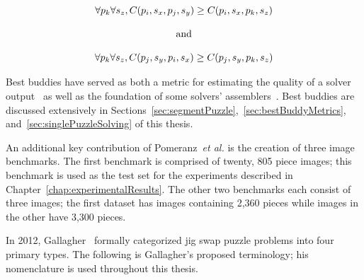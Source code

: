 \begin{equation} \label{eq:pomeranzBestBuddyDefinition}
\centering
\begin{split}
	\begin{matrix}
		\forall{p_{k}}\forall{s_z},C(p_i, s_x, p_j, s_y) \geq C(p_i, s_x, p_k, s_z)
		\\
		\\
		\textnormal{and}
		\\
		\\
		\forall{p_{k}}\forall{s_z},C(p_j, s_y, p_i, s_x) \geq C(p_j, s_y, p_k, s_z)
	\end{matrix}
\end{split}
\end{equation} 

Best buddies have served as both a metric for estimating the quality of a solver output~\cite{sholomon2013} as well as the foundation of some solvers' assemblers~\cite{paikin2015}.  Best buddies are discussed extensively in Sections~\ref{sec:segmentPuzzle},~\ref{sec:bestBuddyMetrics}, and~\ref{sec:singlePuzzleSolving} of this thesis.

An additional key contribution of Pomeranz~\textit{et al.} is the creation of three image benchmarks.  The first benchmark is comprised of twenty, 805 piece images; this benchmark is used as the test set for the experiments described in Chapter~\ref{chap:experimentalResults}. The other two benchmarks each consist of three images; the first dataset has images containing 2,360 pieces while images in the other have 3,300 pieces.

In 2012, Gallagher~\cite{gallagher2012} formally categorized jig swap puzzle problems into four primary types.  The following is Gallagher's proposed terminology; his nomenclature is used throughout this thesis.


